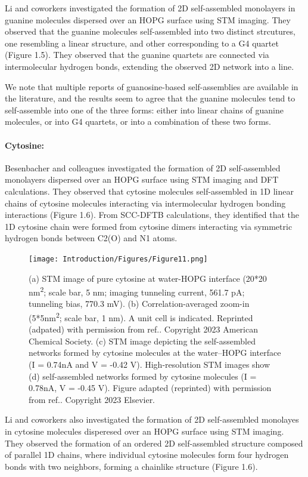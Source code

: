 Li and coworkers investigated the formation of 2D self-assembled monolayers in guanine molecules dispersed over an HOPG surface using STM imaging\supercite{xu_directional_2021}. They observed that the guanine molecules self-assembled into two distinct strcutures, one resembling a linear structure, and other corresponding to a G4 quartet (Figure 1.5). They observed that the guanine quartets are connected via intermolecular hydrogen bonds, extending the observed 2D network into a line.

We note that multiple reports of guanosine-based self-assemblies are available in the literature\supercite{spada_guanosine-based_2008,xu_directional_2021,ciesielski_dynamers_2010,ciesielski_nanopatterning_2010,gottarelli_self-assembly_2000}, and the results seem to agree that the guanine molecules tend to self-assemble into one of the three forms: either into linear chains of guanine molecules, or into G4 quartets, or into a combination of these two forms. 

\paragraph{Cytosine:} Besenbacher and colleagues investigated the formation of 2D self-assembled monolayers dispersed over an HOPG surface using STM imaging and DFT calculations\supercite{xu_coadsorption_2006}. They observed that cytosine molecules self-assembled in 1D linear chains of cytosine molecules interacting via intermolecular hydrogen bonding interactions (Figure 1.6). From SCC-DFTB calculations, they identified that the 1D cytosine chain were formed from cytosine dimers interacting via symmetric hydrogen bonds between C2(O) and N1 atoms.
\begin{figure}
    \centering
    \texttt{[image: Introduction/Figures/Figure11.png]}
    \caption[Representative structures for cytosine self-assemblies over graphene surface]{(a) STM image of pure cytosine at water-HOPG interface (20*20  nm\textsuperscript{2};  scale bar, 5 nm; imaging tunneling current, 561.7 pA; tunneling bias, 770.3 mV). (b) Correlation-averaged zoom-in (5*5nm\textsuperscript{2}; scale bar, 1 nm). A unit cell is indicated. Reprinted (adpated) with permission from ref.\cite{xu_coadsorption_2006}. Copyright 2023 American Chemical Society. (c) STM image depicting the self-assembled networks formed by cytosine molecules at the water–HOPG interface (I = 0.74nA and V = -0.42 V). High-resolution STM images show (d) self-assembled networks formed by cytosine molecules (I = 0.78nA, V = -0.45 V). Figure adapted (reprinted) with permission from ref.\cite{xu_directional_2021}. Copyright 2023 Elsevier.}
    \label{fig:enter-label}
\end{figure}

Li and coworkers also investigated the formation of 2D self-assembled monolayes in cytosine molecules disperesed over an HOPG surface using STM imaging\supercite{xu_directional_2021}. They observed the formation of an ordered 2D self-assembled structure composed of parallel 1D chains, where individual cytosine molecules form four hydrogen bonds with two neighbors, forming a chainlike structure (Figure 1.6).